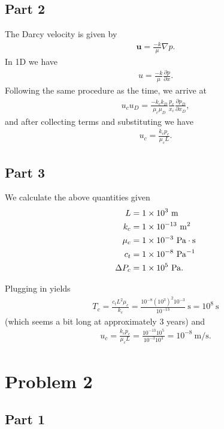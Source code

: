 \documentclass{article}
\begin{document}
\subsection{Part 2}
The Darcy velocity is given by
\begin{align}
\mathbf{u} = \frac{-k}{\mu} \nabla p.
\end{align}
In 1D we have
\begin{align}
u = \frac{-k}{\mu} \frac{\partial p}{\partial x}.
\end{align}
Following the same procedure as the time, we arrive at
\begin{align}
u_c u_D = \frac{-k_c k_D}{\mu_c \mu_D} \frac{p_c}{x_c} \frac{\partial p_D}{\partial x_D},
\end{align}
and after collecting terms and substituting we have
\begin{align}
u_c = \frac{k_c p_c}{\mu_c L}.
\end{align}

\subsection{Part 3}
We calculate the above quantities given
\begin{align}
    L &= \num{1e3}\ \si{\meter} \\
    k_c &= \num{1e-13}\ \si{\meter\squared} \\
    \mu_c &= \num{1e-3}\ \si[inter-unit-product = \ensuremath{{}\cdot{}}]{\pascal\second} \\
    c_t &= \num{1e-8}\ \si{\per\pascal} \\
    \Delta P_c &= \num{1e5}\ \si{\pascal}.
\end{align}

Plugging in yields
\begin{align}
    T_c = \frac{c_t L^2 \mu_c}{k_c} = \frac{10^{-8} (10^3)^2 10^{-3}}{10^{-13}}\ \si{\second} = 10^8\ \si{\second}
\end{align}
(which seems a bit long at approximately 3 years) and
\begin{align}
    u_c = \frac{k_c p_c}{\mu_c L} = \frac{10^{-13} 10^5}{10^{-3} 10^3} = 10^{-8}\ \si{\meter\per\second}.
\end{align}


\section{Problem 2}
\subsection{Part 1}

% 
\end{document}
